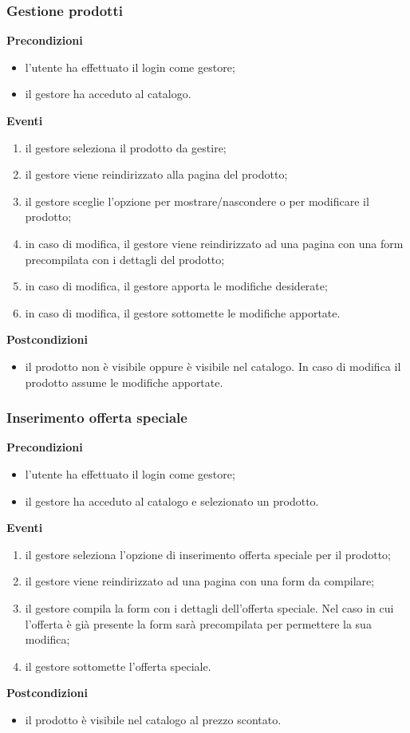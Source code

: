 \documentclass[a4paper, 14pt]{article}
\begin{document}
\begin{flushleft}
			\bigskip
			\subsubsection{Gestione prodotti}
			\textbf{Precondizioni}
			\begin{itemize}
				\item l'utente ha effettuato il login come gestore;
				\item il gestore ha acceduto al catalogo.
			\end{itemize}
			\textbf{Eventi}
			\begin{enumerate}
				\item il gestore seleziona il prodotto da gestire;
				\item il gestore viene reindirizzato alla pagina del prodotto;
				\item il gestore sceglie l'opzione per mostrare/nascondere o per modificare il prodotto;
				\item in caso di modifica, il gestore viene reindirizzato ad una pagina con una form precompilata con i dettagli del prodotto;
				\item in caso di modifica, il gestore apporta le modifiche desiderate;
				\item in caso di modifica, il gestore sottomette le modifiche apportate.
			\end{enumerate}
			\textbf{Postcondizioni}
			\begin{itemize}
				\item il prodotto non è visibile oppure è visibile nel catalogo. In caso di modifica il prodotto assume le modifiche apportate.
			\end{itemize}
		
			\bigskip
			\subsubsection{Inserimento offerta speciale}
			\textbf{Precondizioni}
			\begin{itemize}
				\item l'utente ha effettuato il login come gestore;
				\item il gestore ha acceduto al catalogo e selezionato un prodotto.
			\end{itemize}
			\textbf{Eventi}
			\begin{enumerate}
				\item il gestore seleziona l'opzione di inserimento offerta speciale per il prodotto;
				\item il gestore viene reindirizzato ad una pagina con una form da compilare;
				\item il gestore compila la form con i dettagli dell'offerta speciale. Nel caso in cui l'offerta è già presente la form sarà precompilata per permettere la sua modifica;
				\item il gestore sottomette l'offerta speciale.
			\end{enumerate}
			\textbf{Postcondizioni}
			\begin{itemize}
				\item il prodotto è visibile nel catalogo al prezzo scontato.
			\end{itemize}
		

\end{flushleft}
\end{document}
